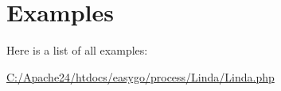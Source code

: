 \section{Examples}
Here is a list of all examples\+:\begin{DoxyCompactItemize}
\item 
\hyperlink{_c_1_2_apache24_2htdocs_2easygo_2process_2_linda_2_linda_8php-example}{C\+:/\+Apache24/htdocs/easygo/process/\+Linda/\+Linda.\+php}
\end{DoxyCompactItemize}
